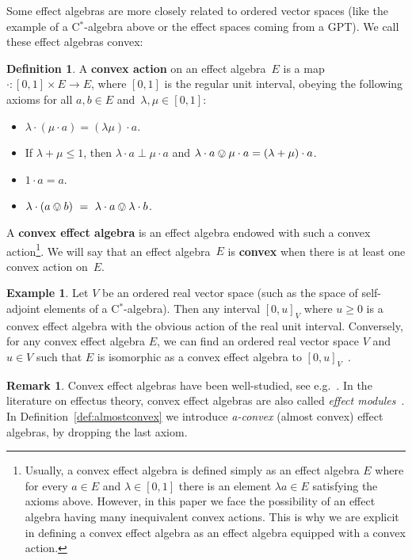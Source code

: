 \documentclass[a4paper, onecolumn, accepted=2020-12-22]{quantumarticle}
\newcommand\Define[1]{\textbf{#1}}
\newcounter{counter}
\theoremstyle{definition}
\newtheorem{definition}[counter]{Definition}
\newtheorem{example}[counter]{Example}
\newtheorem{remark}[counter]{Remark}
\begin{document}
Some effect algebras are more closely related to ordered vector spaces (like the example of a C$^*$-algebra above or the effect spaces coming from a GPT). We call these effect algebras convex:
\begin{definition}\label{def:convex}
  A \Define{convex action}
  on an effect algebra~$E$ is 
   a map $\cdot: [0,1]\times E\rightarrow E$, 
   where $[0,1]$ is the regular unit interval, 
   obeying
    the following axioms for all $a,b\in E$ and~$\lambda, \mu \in
    [0,1]$:
    \begin{itemize}
        \item $\lambda\cdot (\mu\cdot a) = (\lambda\mu)\cdot a$.
    \item If $\lambda+\mu \leq 1$, then $\lambda \cdot a \perp
    \mu \cdot a$ and $\lambda \cdot a \ovee \mu \cdot a =
    (\lambda+\mu)\cdot a$.
        \item $1\cdot a = a$.
        
        \item $\lambda\cdot (a\ovee b) \ = \ \lambda\cdot a \ovee \lambda\cdot b$.
    \end{itemize}
A \Define{convex effect algebra} \cite{gudder1999convex}
is an effect algebra endowed with such a convex action\footnote{Usually, a convex effect algebra is defined simply as an effect algebra $E$ where for every $a\in E$ and $\lambda\in[0,1]$ there is an element $\lambda a\in E$ satisfying the axioms above. However, in this paper we face the possibility of an effect algebra having many inequivalent convex actions. This is why we are explicit in defining a convex effect algebra as an effect algebra equipped with a convex action.}.
  We will say that an effect algebra~$E$ is \Define{convex}
  when there is at least one convex action on~$E$.
\end{definition}

\begin{example}
    Let $V$ be an ordered real vector space (such as the space of self-adjoint elements of a C$^*$-algebra). Then any interval $[0,u]_V$ where $u\geq 0$ is a convex effect algebra with the obvious action of the real unit interval. 
    Conversely, for any convex effect algebra $E$, we can find an ordered real vector space $V$ and $u\in V$ such that $E$ is isomorphic as a convex effect algebra to $[0,u]_V$~\cite{gudder1998representation}.
\end{example}

\begin{remark}
    Convex effect algebras have been well-studied, see e.g.~\cite{jacobs2011probabilities,gudder2018convex,wetering2018characterisation,wetering2018reconstruction,Jencova2019propertiesof}. 
  In the literature on effectus theory, 
  convex effect algebras are also 
  called \emph{effect modules}~\cite{cho2015introduction,kentathesis}.
In Definition~\ref{def:almostconvex} 
  we introduce \emph{a-convex} (almost convex) 
  effect algebras, by dropping the last axiom.
\end{remark}
\end{document}
